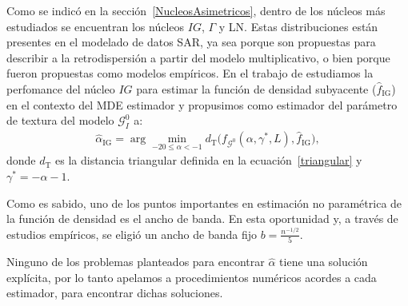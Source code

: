 
Como se indicó en la sección~\ref{NucleosAsimetricos}, dentro de los núcleos más estudiados se encuentran los núcleos $IG$, $\Gamma$ y LN. Estas distribuciones están presentes en el modelado de datos SAR, ya sea porque son propuestas para describir a la retrodispersión a partir del modelo multiplicativo, o bien porque fueron propuestas como modelos empíricos. 
En el trabajo de \citet{gambini2015} estudiamos la perfomance del núcleo $IG$ para estimar la función de densidad subyacente ($\widehat f_\text{IG}$) en el contexto del MDE estimador y propusimos como estimador del parámetro de textura del modelo $\mathcal{G}_I^0$ a:
\begin{align}
\widehat{\alpha}_{\text{IG}}= \arg\min_{-20\leq \alpha < -1} d_{\text{T}}\big(f_{\mathcal{G}^{0}}(\alpha,\gamma^*, L ), \widehat f_\text{IG}\big),
\label{minimization}
\end{align}
donde $d_{\text{T}}$ es la distancia triangular definida en la ecuación~\eqref{triangular} y $\gamma^*=-\alpha-1$.  

Como es sabido, uno de los puntos importantes en estimación no paramétrica de la función de densidad es el ancho de banda. En esta oportunidad y, a través de estudios empíricos, se eligió un ancho de banda fijo $b=\frac{n^{-1/2}}{5}$.


Ninguno de los problemas planteados para encontrar $\widehat{\alpha}$ tiene una solución explícita, por lo tanto apelamos a procedimientos numéricos acordes a cada estimador, para encontrar dichas soluciones. 

